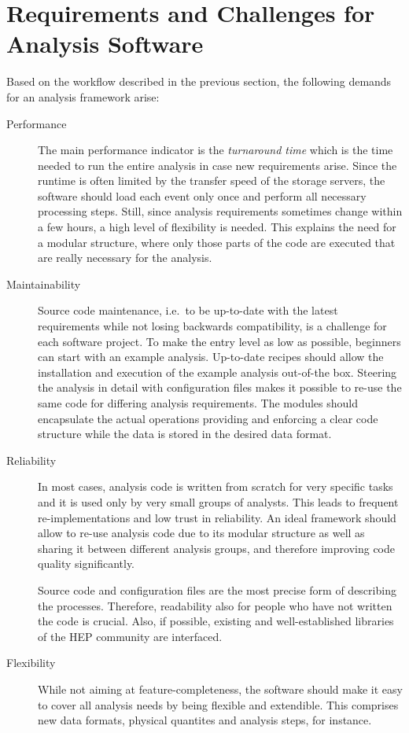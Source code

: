 \documentclass[3p]{elsarticle}
\begin{document}
\section{Requirements and Challenges for Analysis Software}
\label{section_artus_challenges}
Based on the workflow described in the previous section, the following demands for an analysis framework arise:

\begin{description}
\item[Performance]
The main performance indicator is the \emph{turnaround time} which is the time needed to run the entire analysis in case new requirements arise.
Since the runtime is often limited by the transfer speed of the storage servers, the software should load each event only once and perform all necessary processing steps.
Still, since analysis requirements sometimes change within a few hours, a high level of flexibility is needed.
This explains the need for a modular structure, where only those parts of the code are executed that are really necessary for the analysis.

\item[Maintainability]
Source code maintenance, i.e.\ to be up-to-date with the latest requirements while not losing backwards compatibility, is a challenge for each software project.
To make the entry level as low as possible, beginners can start with an example analysis. 
Up-to-date recipes should allow the installation and execution of the example analysis out-of-the box.
Steering the analysis in detail with configuration files makes it possible to re-use the same code for differing analysis requirements.
The modules should encapsulate the actual operations providing and enforcing a clear code structure while the data is stored in the desired data format.

\item[Reliability]
In most cases, analysis code is written from scratch for very specific tasks and it is used only by very small groups of analysts.
This leads to frequent re-imple\-men\-ta\-tions and low trust in reliability.
An ideal framework should allow to re-use analysis code due to its modular structure as well as sharing it between different analysis groups, and therefore improving code quality significantly.

Source code and configuration files are the most precise form of describing the processes.
Therefore, readability also for people who have not written the code is crucial.
Also, if possible, existing and well-established libraries of the HEP community are interfaced.

\item[Flexibility]
While not aiming at feature-completeness, the software should make it easy to cover all analysis needs by being flexible and extendible.
This comprises new data formats, physical quantites and analysis steps, for instance.
\end{description}
\end{document}
